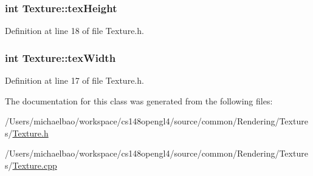 \subsubsection[{tex\+Height}]{\setlength{\rightskip}{0pt plus 5cm}int Texture\+::tex\+Height\hspace{0.3cm}{\ttfamily [private]}}\label{class_texture_ac9ce8215cc356702b12a05a05ae3029a}


Definition at line 18 of file Texture.\+h.

\hypertarget{class_texture_a3ce375542bd2d62f6e1793558c934373}{}
\subsubsection[{tex\+Width}]{\setlength{\rightskip}{0pt plus 5cm}int Texture\+::tex\+Width\hspace{0.3cm}{\ttfamily [private]}}\label{class_texture_a3ce375542bd2d62f6e1793558c934373}


Definition at line 17 of file Texture.\+h.



The documentation for this class was generated from the following files\+:\begin{DoxyCompactItemize}
\item 
/\+Users/michaelbao/workspace/cs148opengl4/source/common/\+Rendering/\+Textures/\hyperlink{_texture_8h}{Texture.\+h}\item 
/\+Users/michaelbao/workspace/cs148opengl4/source/common/\+Rendering/\+Textures/\hyperlink{_texture_8cpp}{Texture.\+cpp}\end{DoxyCompactItemize}
